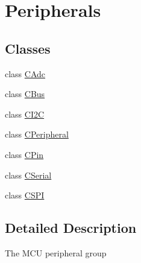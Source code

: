 \hypertarget{group___peripherals}{\section{Peripherals}
\label{group___peripherals}
}
\subsection*{Classes}
\begin{DoxyCompactItemize}
\item 
class \hyperlink{class_c_adc}{C\-Adc}
\item 
class \hyperlink{class_c_bus}{C\-Bus}
\item 
class \hyperlink{class_c_i2_c}{C\-I2\-C}
\item 
class \hyperlink{class_c_peripheral}{C\-Peripheral}
\item 
class \hyperlink{class_c_pin}{C\-Pin}
\item 
class \hyperlink{class_c_serial}{C\-Serial}
\item 
class \hyperlink{class_c_s_p_i}{C\-S\-P\-I}
\end{DoxyCompactItemize}


\subsection{Detailed Description}
The M\-C\-U peripheral group 
